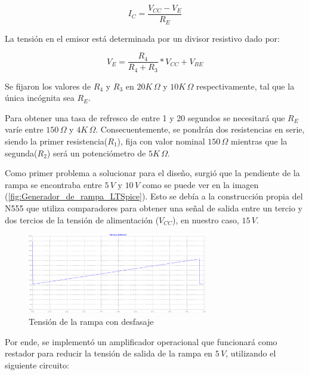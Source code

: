 \begin{equation}
I_C=\frac{V_{CC}-V_E}{R_E}
\end{equation}

La tensión en el emisor está determinada por un divisor resistivo dado por:

\begin{equation}
V_E=\frac{R_4}{R_4+R_3} * V_{CC} + V_{BE}
\end{equation}

Se fijaron los valores de $R_4$ y $R_3$ en $20K\,\Omega$ y $10K\,\Omega$ respectivamente, tal que la única incógnita sea $R_E$. \par
Para obtener una tasa de refresco de entre 1 y 20 segundos se necesitará que $R_E$ varíe entre $150\,\Omega$ y $4K\,\Omega$. Consecuentemente, se pondrán dos resistencias en serie, siendo la primer resistencia($R_1$), fija con valor nominal $150\,\Omega$ mientras que la segunda($R_2$) será un potenciómetro de $5K\,\Omega$.

Como primer problema a solucionar para el diseño, surgió que la pendiente de la rampa se encontraba entre $5\,V$ y $10\,V$ como se puede ver en la imagen (\ref{fig:Generador_de_rampa_LTSpice}). Esto se debía a la construcción propia del N555 que utiliza comparadores para obtener una señal de salida entre un tercio y dos tercios de la tensión de alimentación ($V_{CC}$), en nuestro caso, $15\,V$.


\begin{figure}[H]
\centering
\includegraphics[width=0.7\textwidth]{Ejercicio8/Imagenes/Rampa_desfasada}
\caption{Tensión de la rampa con desfasaje}
\label{fig:Generador_de_rampa_desfasada_LTSpice}
\end{figure}

Por ende, se implementó un amplificador operacional que funcionará como restador para reducir la tensión de salida de la rampa en $5\,V$, utilizando el siguiente circuito:

